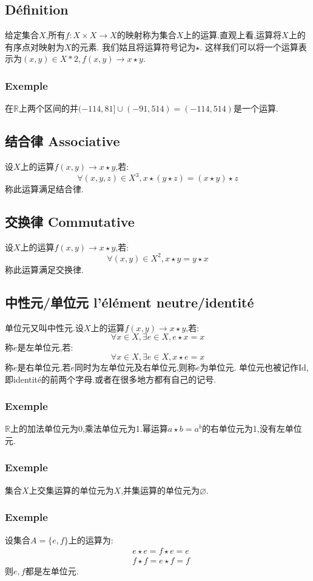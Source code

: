 \documentclass[12pt, a4paper, oneside]{ctexbook}
\newcommand{\R }{\mathbb{R}}%
\newcommand{\Id }{\text{Id}}%
\begin{document}
  \subsection{Définition}
  给定集合$X$,所有$f:X\times X\rightarrow X$的映射称为集合$X$上的运算.直观上看,运算将$X$上的有序点对映射为$X$的元素.
  我们姑且将运算符号记为$\star $.
  这样我们可以将一个运算表示为$(x,y)\in X*2,f(x,y)\rightarrow x\star y$.
  \subsubsection{Exemple}
  在$\R$上两个区间的并$(-114,81]\cup (-91,514)=(-114,514)$是一个运算.
  \subsection{结合律 Associative}
  设$X$上的运算$f(x,y)\rightarrow x\star y $,若:
  $$
  \forall (x,y,z)\in X^3, x\star(y\star z)=(x\star y)\star z
  $$
  称此运算满足结合律.
  \subsection{交换律 Commutative}
  设$X$上的运算$f(x,y)\rightarrow x\star y $,若:
  $$
  \forall (x,y)\in X^2, x\star y=y\star x
  $$
  称此运算满足交换律.
  \subsection{中性元/单位元 l'élément neutre/identité}
  单位元又叫中性元.设$X$上的运算$f(x,y)\rightarrow x\star y $,若:
  $$
  \forall x\in X, \exists e\in X,e\star x=x
  $$
  称$e$是左单位元,若:
  $$
  \forall x\in X, \exists e\in X,x\star e=x
  $$
  称$e$是右单位元,若$e$同时为左单位元及右单位元,则称$e$为单位元.
  单位元也被记作$\Id$,即identité的前两个字母.或者在很多地方都有自己的记号.
  \subsubsection{Exemple}
  $\R $上的加法单位元为0,乘法单位元为1.幂运算$a\star b=a^b$的右单位元为1,没有左单位元.
  \subsubsection{Exemple}
  集合$X$上交集运算的单位元为$X$,并集运算的单位元为$\varnothing $.
  \subsubsection{Exemple}
  设集合$A=\{e,f\}$上的运算为:
  $$
    \begin{aligned}&
    e\star e=f\star e=e\\&
    f\star f=e\star f=f
  \end{aligned}
  $$则$e,f$都是左单位元.
\end{document}
